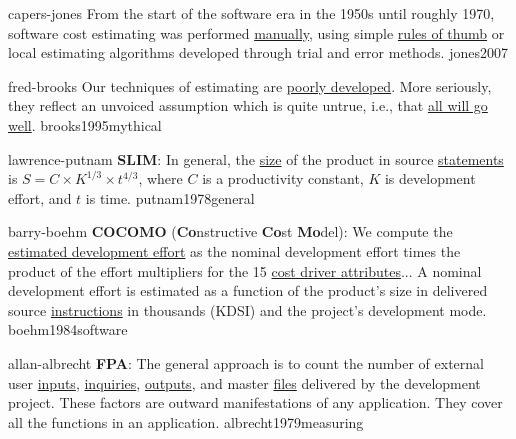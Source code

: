 \documentclass{article}
\begin{document}

\qte
  {capers-jones}
  {From the start of the software era in the 1950s until roughly 1970, software cost estimating was performed \ul{manually}, using simple \ul{rules of thumb} or local estimating algorithms developed through trial and error methods.}
  {jones2007}

\qte
  {fred-brooks}
  {Our techniques of estimating are \ul{poorly developed}. More seriously, they reflect an unvoiced assumption which is quite untrue, i.e., that \ul{all will go well}.}
  {brooks1995mythical}

\qte
  {lawrence-putnam}
  {\textbf{SLIM}: In general, the \ul{size} of the product in source \ul{statements} is \(S = C \times K^{1/3} \times t^{4/3}\), where \(C\) is a productivity constant, \(K\) is development effort, and \(t\) is time.}
  {putnam1978general}

\qte
  {barry-boehm}
  {\textbf{COCOMO} (\textbf{Co}nstructive \textbf{Co}st \textbf{Mo}del): We compute the \ul{estimated development effort} as the nominal development effort times the product of the effort multipliers for the 15 \ul{cost driver attributes}... A nominal development effort is estimated as a function of the product's size in delivered source \ul{instructions} in thousands (KDSI) and the project's development mode.}
  {boehm1984software}

\qte
  {allan-albrecht}
  {\textbf{FPA}: The general approach is to count the number of external user \ul{inputs}, \ul{inquiries}, \ul{outputs}, and master \ul{files} delivered by the development project. These factors are outward manifestations of any application. They cover all the functions in an application.}
  {albrecht1979measuring}

\end{document}
